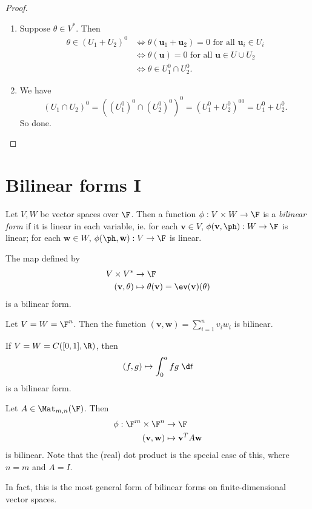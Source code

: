 \documentclass[a4paper]{article}
\begin{document}
\begin{proof}\leavevmode
  \begin{enumerate}
    \item Suppose $\theta \in V^*$. Then
      \begin{align*}
        \theta \in (U_1 + U_2)^0 &\Leftrightarrow \theta (\mathbf{u}_1 + \mathbf{u}_2) = 0\text{ for all }\mathbf{u}_i \in U_i\\
        &\Leftrightarrow \theta (\mathbf{u}) = 0\text{ for all }\mathbf{u} \in U\cup U_2\\
        &\Leftrightarrow \theta \in U_1^0 \cap U_2^0.
      \end{align*}
    \item We have
      \[
        (U_1 \cap U_2)^0 = ((U_1^0)^0 \cap (U_2^0)^0)^0 = (U_1^0 + U_2^0)^{00} = U_1^0 + U_2^0.
      \]
      So done.
  \end{enumerate}
\end{proof}

\section{Bilinear forms I}
\begin{defi}
  Let $V, W$ be vector spaces over $\F$. Then a function $\phi: V\times W \to \F$ is a \emph{bilinear form} if it is linear in each variable, ie. for each $\mathbf{v} \in V$, $\phi(\mathbf{v}, \ph): W \to \F$ is linear; for each $\mathbf{w} \in W$, $\phi(\ph, \mathbf{w}): V\to \F$ is linear.
\end{defi}

\begin{eg}
  The map defined by
  \begin{align*}
    V\times V^* &\to \F\\
    (\mathbf{v}, \theta) &\mapsto \theta(\mathbf{v}) = \ev(\mathbf{v})(\theta)
  \end{align*}
  is a bilinear form.
\end{eg}

\begin{eg}
  Let $V = W = \F^n$. Then the function $(\mathbf{v}, \mathbf{w}) = \sum_{i = 1}^n v_i w_i$ is bilinear.
\end{eg}

\begin{eg}
  If $V = W = C([0, 1], \R)$, then
  \[
    (f, g) \mapsto \int_0^a fg \;\d t
  \]
  is a bilinear form.
\end{eg}

\begin{eg}
  Let $A \in \Mat_{m, n}(\F)$. Then
  \begin{align*}
    \phi: \F^m \times \F^n &\to \F\\
       (\mathbf{v}, \mathbf{w}) &\mapsto \mathbf{v}^T A\mathbf{w}
  \end{align*}
  is bilinear. Note that the (real) dot product is the special case of this, where $n = m$ and $A = I$.
\end{eg}
In fact, this is the most general form of bilinear forms on finite-dimensional vector spaces.
\end{document}
